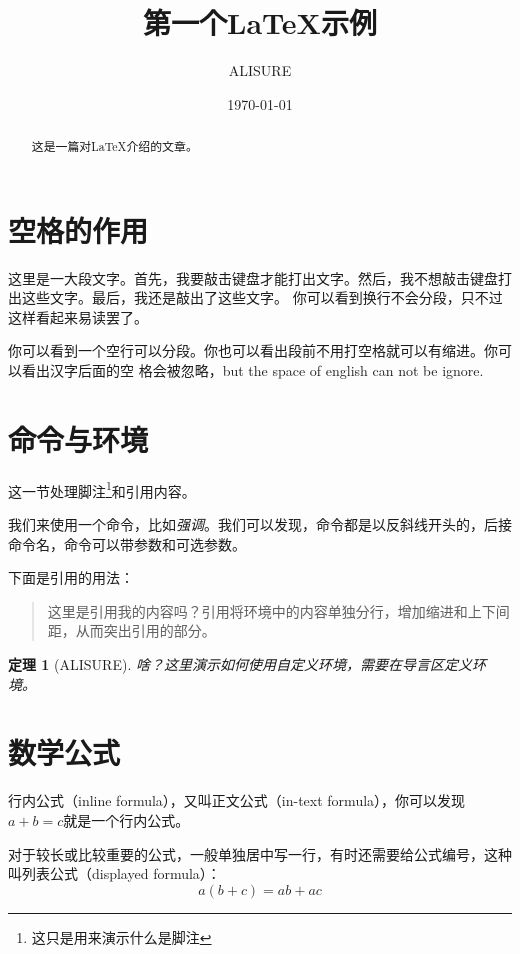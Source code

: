 \documentclass[UTF8]{ctexart}  %
\title{第一个\LaTeX 示例}  %
\author{ALISURE}  %
\date{\today}  %
\newtheorem{thm}{定理}  %
\begin{document}
	
	\maketitle  %
	\tableofcontents  %
	
	\begin{abstract}
		这是一篇对\LaTeX 介绍的文章。
	\end{abstract}
	
	\section{空格的作用}  %
		这里是一大段文字。首先，我要敲击键盘才能打出文字。然后，我不想敲击键盘打出这些文字。最后，我还是敲出了这些文字。
		你可以看到换行不会分段，只不过这样看起来易读罢了。
		
		你可以看到一个空行可以分段。你也可以看出段前不用打空格就可以有缩进。你可以看出汉字后面的空 格会被忽略，but the space of english   can not be  ignore.
		
	\section{命令与环境}  %
		这一节处理脚注\footnote{这只是用来演示什么是脚注}和引用内容。
		
		我们来使用一个命令，比如\emph{强调}。我们可以发现，命令都是以反斜线开头的，后接命令名，命令可以带参数和可选参数。
		
		下面是引用的用法：
		\begin{quote}
			这里是引用我的内容吗？引用将环境中的内容单独分行，增加缩进和上下间距，从而突出引用的部分。
		\end{quote}
		
		\begin{thm}[ALISURE]
			啥？这里演示如何使用自定义环境，需要在导言区定义环境。
		\end{thm}
		
	\section{数学公式}
		行内公式（inline formula），又叫正文公式（in-text formula），你可以发现$a+b=c$就是一个行内公式。
		
		对于较长或比较重要的公式，一般单独居中写一行，有时还需要给公式编号，这种叫列表公式（displayed formula）：
		\begin{equation}
			a(b+c) = ab + ac
		\end{equation}
		
\end{document}

